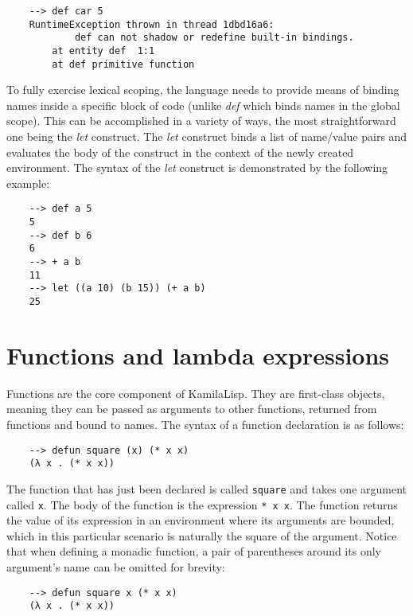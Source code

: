 \begin{Verbatim}
    --> def car 5
    RuntimeException thrown in thread 1dbd16a6:
            def can not shadow or redefine built-in bindings.
        at entity def  1:1
        at def primitive function
\end{Verbatim}

To fully exercise lexical scoping, the language needs to provide means of binding names inside a specific block of code (unlike \textit{def} which binds names in the global scope). This can be accomplished in a variety of ways, the most straightforward one being the \textit{let} construct. The \textit{let} construct binds a list of name/value pairs and evaluates the body of the construct in the context of the newly created environment. The syntax of the \textit{let} construct is demonstrated by the following example:

\begin{Verbatim}
    --> def a 5
    5
    --> def b 6
    6
    --> + a b
    11
    --> let ((a 10) (b 15)) (+ a b)
    25
\end{Verbatim}

\section{Functions and lambda expressions}

Functions are the core component of KamilaLisp. They are first-class objects, meaning they can be passed as arguments to other functions, returned from functions and bound to names. The syntax of a function declaration is as follows:

\begin{Verbatim}
    --> defun square (x) (* x x)
    (λ x . (* x x))
\end{Verbatim}

The function that has just been declared is called \verb|square| and takes one argument called \verb|x|. The body of the function is the expression \verb|* x x|. The function returns the value of its expression in an environment where its arguments are bounded, which in this particular scenario is naturally the square of the argument. Notice that when defining a monadic function, a pair of parentheses around its only argument's name can be omitted for brevity:

\begin{Verbatim}
    --> defun square x (* x x)
    (λ x . (* x x))
\end{Verbatim}

